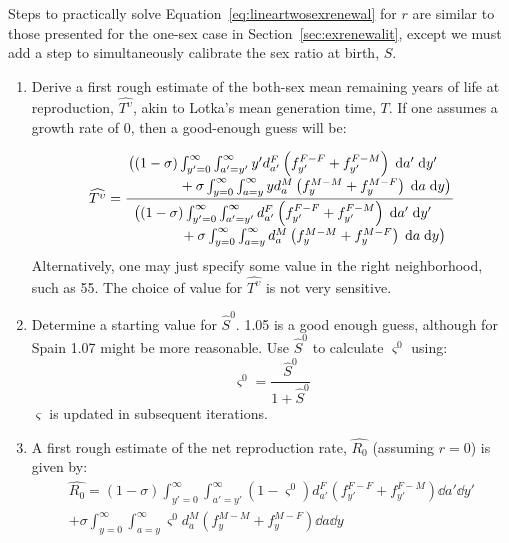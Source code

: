  \FloatBarrier
\label{sec:exrenewalit2}
Steps to practically solve Equation~\eqref{eq:lineartwosexrenewal} for $r$ are
similar to those presented for the one-sex case in
Section~\ref{sec:exrenewalit}, except we must add a step to simultaneously
calibrate the sex ratio at birth, $S$.
\begin{enumerate}
  \item Derive a first rough estimate of the both-sex mean remaining years of
  life at reproduction, $\widehat{T^\upsilon}$, akin to Lotka's mean generation time,
  $T$. If one assumes a growth rate of $0$, then a good-enough guess will be:

\begin{equation}
\label{eq:Tguess}
\widehat{T^\upsilon} = \frac{\splitfrac{
   \big((1 - \sigma)  \int _{y'=0}^\infty \int_{a'=y'}^\infty 
       y' d_{a'}^F \left( f_{y'}^{F-F} + f_{y'}^{F-M} \right) \dd a'\dd y'}{ + 
   \sigma \int_{y=0}^\infty \int _{a=y}^\infty y d_{a}^M  \left( f_{y}^{M-M}+
   f_{y}^{M-F} \right) \dd a \dd y \big)}}{\splitfrac{\big( (1 - \sigma) 
   \int_{y'=0}^\infty \int_{a'=y'}^\infty d_{a'}^F \left( f_{y'}^{F-F} +
   f_{y'}^{F-M} \right) \dd a'\dd y'}{ +\sigma \int _{y=0}^\infty
   \int_{a=y}^\infty d_{a}^M \left( f_{y}^{M-M} + f_{y}^{M-F} \right) \dd a \dd
   y \big)}}
\end{equation}
  Alternatively, one may just specify some value in the right neighborhood, such
  as 55. The choice of value for $\widehat{T^\upsilon}$ is not very sensitive.
 \item Determine a starting value for $\hat{S}^0$. 1.05 is a good enough guess,
although for Spain 1.07 might be more reasonable. Use $\hat{S}^0$ to calculate
$\varsigma^0$ using:
\begin{equation}
\label{eq:getvarsigmal}
\varsigma^0 = \frac{\hat{S}^0}{1+\hat{S}^0}
\end{equation}
$\varsigma$ is updated in subsequent iterations.
   \item A first rough estimate of the net reproduction rate, $\widehat{R_0}$ (assuming
  $r=0$) is given by: 
 \begin{equation}
 \begin{split}
 \widehat{R_0} = (1 - \sigma)  \int _{y'=0}^\infty \int_{a'=y'}^\infty 
                (1-\varsigma^0)d_{a'}^F \left(f_{y'}^{F-F} + f_{y'}^{F-M}\right)
                \dd a'\dd y' \\ + \sigma  \int _{y=0}^\infty \int _{a=y}^\infty 
               \varsigma^0 d_{a}^M  \left(f_{y}^{M-M}+ f_{y}^{M-F}\right) \dd a
               \dd y

\end{split}
\end{equation}
\end{enumerate}
